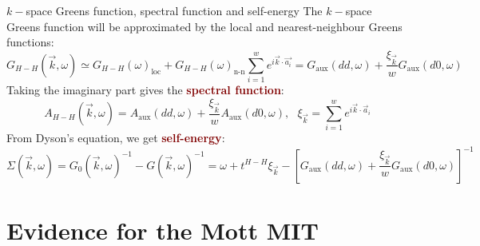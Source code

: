 \documentclass[aspectratio=169]{beamer}
\newcommand{\focus}[1]{\textcolor{maroon}{\textbf{#1}}}
\begin{document}
\begin{frame}[noframenumbering]{\(k-\)space Greens function, spectral function and self-energy}
The \(k-\)space Greens function will be approximated by the local and nearest-neighbour Greens functions:
\[G_{H-H} (\vec k, \omega) \simeq G_{H-H} (\omega)_\text{loc} + G_{H-H} (\omega)_\text{n-n}\sum_{i=1}^w e^{i \vec{k}\cdot\vec {a_i}} = G_\text{aux}(dd, \omega) + \frac{\xi_{\vec k}}{w}G_\text{aux}(d0, \omega)\]
Taking the imaginary part gives the \focus{spectral function}:
\[A_{H-H} (\vec k, \omega) = A_\text{aux}(dd, \omega) + \frac{\xi_{\vec k}}{w}A_\text{aux}(d0, \omega), ~ ~ ~ \xi_{\vec k} = \sum_{i=1}^w e^{i \vec{k}\cdot\vec{a}_i}\]
From Dyson's equation, we get \focus{self-energy}:
\[\Sigma(\vec k, \omega) = G_0(\vec k, \omega)^{-1} - G(\vec k, \omega)^{-1} = \omega +t^{H-H}\xi_{\vec k} - \left [G_\text{aux}\left(dd, \omega\right) + \frac{\xi_{\vec k}}{w} G_\text{aux}\left(d0, \omega\right)\right]^{-1}\]
\end{frame}

\section{Evidence for the Mott MIT}
\label{mit}
\end{document}
